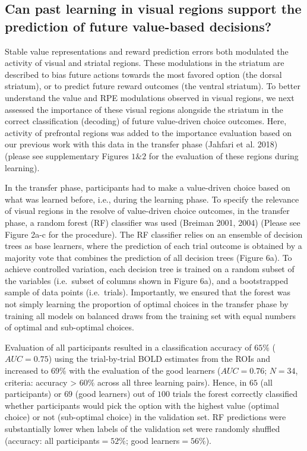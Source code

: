 \documentclass[]{article}
\begin{document}
\hypertarget{can-past-learning-in-visual-regions-support-the-prediction-of-future-value-based-decisions}{%
\subsection{Can past learning in visual regions support the prediction
of future value-based
decisions?}\label{can-past-learning-in-visual-regions-support-the-prediction-of-future-value-based-decisions}}

Stable value representations and reward prediction errors both modulated
the activity of visual and striatal regions. These modulations in the
striatum are described to bias future actions towards the most favored
option (the dorsal striatum), or to predict future reward outcomes (the
ventral striatum). To better understand the value and RPE modulations
observed in visual regions, we next assessed the importance of these
visual regions alongside the striatum in the correct classification
(decoding) of future value-driven choice outcomes. Here, activity of
prefrontal regions was added to the importance evaluation based on our
previous work with this data in the transfer phase (Jahfari et al. 2018)
(please see supplementary Figures \(1\&2\) for the evaluation of these
regions during learning).

In the transfer phase, participants had to make a value-driven choice
based on what was learned before, i.e., during the learning phase. To
specify the relevance of visual regions in the resolve of value-driven
choice outcomes, in the transfer phase, a random forest (RF) classifier
was used (Breiman 2001, 2004) (Please see Figure 2a-c for the
procedure). The RF classifier relies on an ensemble of decision trees as
base learners, where the prediction of each trial outcome is obtained by
a majority vote that combines the prediction of all decision trees
(Figure 6a). To achieve controlled variation, each decision tree is
trained on a random subset of the variables (i.e.~subset of columns
shown in Figure 6a), and a bootstrapped sample of data points
(i.e.~trials). Importantly, we ensured that the forest was not simply
learning the proportion of optimal choices in the transfer phase by
training all models on balanced draws from the training set with equal
numbers of optimal and sub-optimal choices.

Evaluation of all participants resulted in a classification accuracy of
\(65\%\) (\(AUC=0.75\)) using the trial-by-trial BOLD estimates from the
ROIs and increased to \(69\%\) with the evaluation of the good learners
(\(AUC=0.76\); \(N=34\), criteria: accuracy \textgreater{} \(60\%\)
across all three learning pairs). Hence, in \(65\) (all participants) or
\(69\) (good learners) out of \(100\) trials the forest correctly
classified whether participants would pick the option with the highest
value (optimal choice) or not (sub-optimal choice) in the validation
set. RF predictions were substantially lower when labels of the
validation set were randomly shuffled (accuracy: all
participants\(=52\%\); good learners\(=56\%\)).
\end{document}
